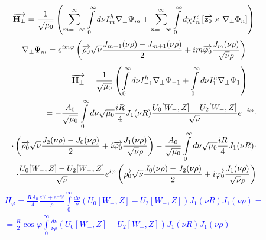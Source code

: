 \textcolor{blue} { \begin{equation*} \begin{aligned}
\overrightarrow{\mathbf H_\perp} = \frac{1}{\sqrt{\mu_0}} \left( 
\sum \limits_{m=-\infty}^{\infty} \int \limits_{0}^{\infty} d \nu
I_m^h \nabla_\perp \Psi_m + \sum \limits_{n=-\infty}^{\infty}
\int \limits_{0}^{\infty} d \chi I_n^e 
\left[ \overrightarrow{\mathbf z_0} \times \nabla_\perp \Phi_n \right] \right)
\end{aligned} \end{equation*} }
%
\textcolor{blue} { \begin{equation*} \begin{aligned}
\nabla_\perp \Psi_m = e^{i m \varphi} \left( \overrightarrow{\mathbf \rho_0} 
\sqrt{\nu} \frac{ J_{m-1}(\nu \rho) - J_{m+1}(\nu \rho) }{2} +
i m \overrightarrow{\mathbf \varphi_0} \frac{J_m(\nu \rho)}{\sqrt{\nu} \rho} \right)
\end{aligned} \end{equation*} }
%
\textcolor{blue} { \begin{equation*} \begin{aligned}
\overrightarrow{\mathbf H_\perp} = \frac{1}{\sqrt{\mu_0}} \left( 
\int \limits_{0}^{\infty} d \nu I_{-1}^h \nabla_\perp \Psi_{-1} +
\int \limits_{0}^{\infty} d \nu I_1^h \nabla_\perp \Psi_1 \right) = \\
= - \frac{A_0}{\sqrt{\mu_0}} \int \limits_{0}^{\infty} d \nu
\sqrt{\mu_0} \frac{iR}{4} J_1 (\nu R)
\frac{ U_0 [ W_-, Z ] - U_2 [ W_-, Z ] }{\sqrt{\nu}}  
e^{- i \varphi} \cdot \\ \cdot \left( \overrightarrow{\mathbf \rho_0} 
\sqrt{\nu} \frac{ J_{2}(\nu \rho) - J_{0}(\nu \rho) }{2} +
i \overrightarrow{\mathbf \varphi_0} \frac{J_1(\nu \rho)}{\sqrt{\nu} \rho} \right) -
\frac{A_0}{\sqrt{\mu_0}} \int \limits_{0}^{\infty} d \nu 
\sqrt{\mu_0} \frac{iR}{4} J_1 (\nu R) \cdot \\
\cdot \frac{ U_0 [ W_-, Z ] - U_2 [ W_-, Z ] }{\sqrt{\nu}} 
e^{i \varphi} \left( \overrightarrow{\mathbf \rho_0} 
\sqrt{\nu} \frac{ J_{0}(\nu \rho) - J_{2}(\nu \rho) }{2} +
i \overrightarrow{\mathbf \varphi_0} \frac{J_1(\nu \rho)}{\sqrt{\nu} \rho} \right)
\end{aligned} \end{equation*} }
%
\textcolor{blue} { \begin{equation*} \begin{aligned}
H_\varphi = \frac{R A_0}{4} 
\frac{e^{i \varphi} + e^{- i \varphi}}{\rho} \int \limits_{0}^{\infty} 
\frac{d\nu}{\nu} (U_0[ W_-, Z ] - U_2[ W_-, Z ]) J_1(\nu R) J_1(\nu \rho) = \\
= \frac{R}{2} \cos \varphi \int \limits_{0}^{\infty}
\frac{d\nu}{\nu \rho} (U_0[ W_-, Z ] - U_2[ W_-, Z ]) 
J_1(\nu R) J_1(\nu \rho)
\end{aligned} \end{equation*} }
